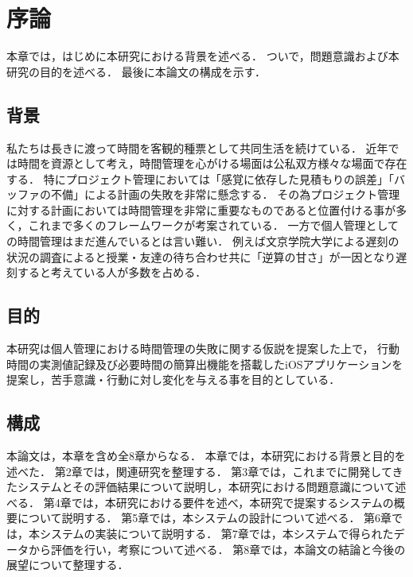 \chapter{序論}
本章では，はじめに本研究における背景を述べる．
ついで，問題意識および本研究の目的を述べる．
最後に本論文の構成を示す．

\section{背景}

私たちは長きに渡って時間を客観的種票として共同生活を続けている\cite{history}．
近年では時間を資源として考え，時間管理を心がける場面は公私双方様々な場面で存在する．
特にプロジェクト管理においては「感覚に依存した見積もりの誤差」「バッファの不備」による計画の失敗を非常に懸念する\cite{innopm}．
その為プロジェクト管理に対する計画においては時間管理を非常に重要なものであると位置付ける事が多く，これまで多くのフレームワークが考案されている．
一方で個人管理としての時間管理はまだ進んでいるとは言い難い．
例えば文京学院大学による遅刻の状況の調査によると授業・友達の待ち合わせ共に「逆算の甘さ」が一因となり遅刻すると考えている人が多数を占める\cite{bunkyo}．

\section{目的}
本研究は個人管理における時間管理の失敗に関する仮説を提案した上で，
行動時間の実測値記録及び必要時間の簡算出機能を搭載したiOSアプリケーションを提案し，苦手意識・行動に対し変化を与える事を目的としている．

\section{構成}
本論文は，本章を含め全8章からなる．
本章では，本研究における背景と目的を述べた．
第2章では，関連研究を整理する．
第3章では，これまでに開発してきたシステムとその評価結果について説明し，本研究における問題意識について述べる．
第4章では，本研究における要件を述べ，本研究で提案するシステムの概要について説明する．
第5章では，本システムの設計について述べる．
第6章では，本システムの実装について説明する．
第7章では，本システムで得られたデータから評価を行い，考察について述べる．
第8章では，本論文の結論と今後の展望について整理する．